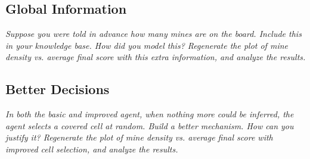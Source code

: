 \documentclass[11pt]{article} %
\begin{document}
\subsection{Global Information}

\textit{Suppose you were told in advance how many mines are on the board. Include this in your knowledge base. How did you model this? Regenerate the plot of mine density vs. average final score with this extra information, and analyze the results.}\\

\subsection{Better Decisions}

\textit{In both the basic and improved agent, when nothing more could be inferred, the agent selects a covered cell at random. Build a better mechanism. How can you justify it? Regenerate the plot of mine density vs. average final score with improved cell selection, and analyze the results.}\\
\end{document}
